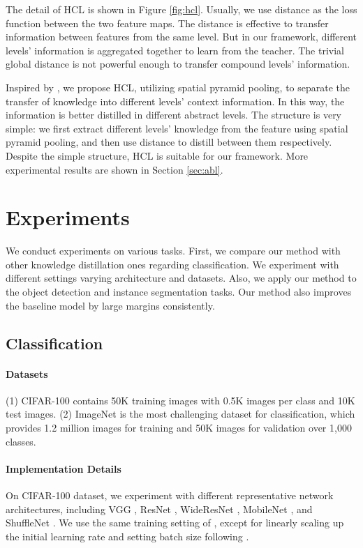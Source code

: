 \documentclass[final]{cvpr}
\begin{document}
The detail of HCL is shown in Figure \ref{fig:hcl}. Usually, we use  distance as the loss function between the two feature maps. The  distance is effective to transfer information between features from the same level. But in our framework, different levels' information is aggregated together to learn from the teacher. The trivial global  distance is not powerful enough to transfer compound levels' information. 

Inspired by \cite{pspnet}, we propose HCL, utilizing spatial pyramid pooling, to separate the transfer of knowledge into different levels' context information. In this way, the information is better distilled in different abstract levels. The structure is very simple: we first extract different levels' knowledge from the feature using spatial pyramid pooling, and then use  distance to distill between them respectively. Despite the simple structure, HCL is suitable for our framework. More experimental results are shown in Section \ref{sec:abl}.


\section{Experiments}
\label{sec:experiments}
We conduct experiments on various tasks. First, we compare our method with other knowledge distillation ones regarding classification. We experiment with different settings varying architecture and datasets. Also, we apply our method to the object detection and instance segmentation tasks. Our method also improves the baseline model by large margins consistently. 

\subsection{Classification}

\paragraph{Datasets}
(1) CIFAR-100 contains 50K training images with 0.5K images per class and 10K test images.  (2) ImageNet \cite{imagenet} is the most challenging dataset for classification, which provides 1.2 million images for training and 50K images for validation over 1,000 classes.

\vspace{-0.1in} \paragraph{Implementation Details}
On CIFAR-100 dataset, we experiment with different representative network architectures, including VGG \cite{vgg}, ResNet \cite{resnet}, WideResNet \cite{wideresnet}, MobileNet \cite{mobilev2}, and ShuffleNet \cite{shufflev1,shufflev2}. We use the same training setting of \cite{crd}, except for linearly scaling up the initial learning rate and setting batch size following \cite{onehour}. 
\end{document}
